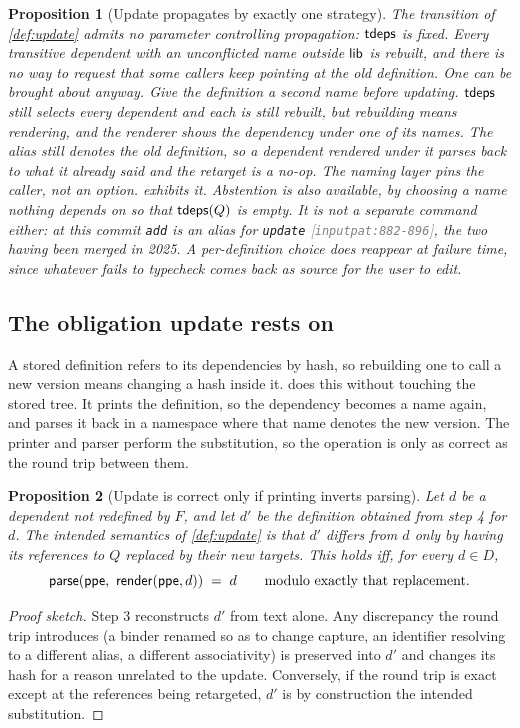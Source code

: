 \documentclass[11pt]{article}
\theoremstyle{definition}
\theoremstyle{plain}
\newtheorem{proposition}{Proposition}[section]
\theoremstyle{remark}
\newcommand{\src}[1]{{\footnotesize\textcolor{gray}{[\texttt{#1}]}}}
\begin{document}
\begin{proposition}[Update propagates by exactly one strategy]\label{prop:follow-only}
The transition of \cref{def:update} admits no parameter controlling propagation: $\mathsf{tdeps}$ is fixed.
Every transitive dependent with an unconflicted name outside $\mathsf{lib}$ is rebuilt, and there is no way to
\emph{request} that some callers keep pointing at the old definition. One can be brought about anyway.
Give the definition a second name before updating. $\mathsf{tdeps}$ still selects every dependent and each is
still rebuilt, but rebuilding means rendering, and the renderer shows the dependency under one of its
names. The alias still denotes the old definition, so a dependent rendered under it parses back to
what it already said and the retarget is a no-op. The naming layer pins the caller, not an option.
 exhibits it. Abstention is also available, by choosing a name nothing depends
on so that $\mathsf{tdeps}(Q)$ is empty. It is not a separate command either: at this commit \texttt{add} is
an alias for \texttt{update} \src{inputpat:882-896}, the two having been merged in 2025. A
per-definition choice does reappear at failure time, since whatever fails to typecheck comes back as
source for the user to edit.
\end{proposition}

\subsection{The obligation update rests on}

A stored definition refers to its dependencies by hash, so rebuilding one to call a new version means
changing a hash inside it.  does this without touching the stored tree. It prints
the definition, so the dependency becomes a name again, and parses it back in a namespace where that
name denotes the new version. The printer and parser perform the substitution, so the operation is
only as correct as the round trip between them.

\begin{proposition}[Update is correct only if printing inverts parsing]\label{prop:print-parse}
Let $d$ be a dependent not redefined by $F$, and let $d'$ be the definition obtained from step 4 for
$d$. The intended semantics of \cref{def:update} is that $d'$ differs from $d$ \emph{only} by having
its references to $Q$ replaced by their new targets. This holds iff, for every $d \in D$,
\[
  \mathsf{parse}(\mathsf{ppe},\ \mathsf{render}(\mathsf{ppe}, d)) \;=\; d
  \qquad\text{modulo exactly that replacement.}
\]
\end{proposition}
\begin{proof}[Proof sketch]
Step 3 reconstructs $d'$ from text alone. Any discrepancy the round trip introduces (a binder renamed
so as to change capture, an identifier resolving to a different alias, a different associativity) is
preserved into $d'$ and changes its hash for a reason unrelated to the update. Conversely, if the
round trip is exact except at the references being retargeted, $d'$ is by construction the intended
substitution.
\end{proof}
\end{document}
